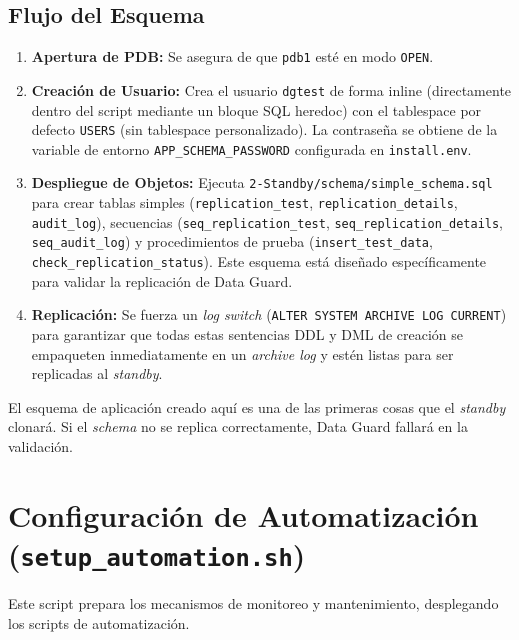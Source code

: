 \documentclass[11pt, a4paper]{report}
\begin{document}
\subsection{Flujo del Esquema}
\begin{enumerate}
    \item \textbf{Apertura de PDB:} Se asegura de que \texttt{pdb1} esté en modo \texttt{OPEN}.
\item \textbf{Creación de Usuario:} Crea el usuario \texttt{dgtest} de forma inline (directamente dentro del script mediante un bloque SQL heredoc) con el tablespace por defecto \texttt{USERS} (sin tablespace personalizado). La contraseña se obtiene de la variable de entorno \texttt{APP\_SCHEMA\_PASSWORD} configurada en \texttt{install.env}.
\item \textbf{Despliegue de Objetos:} Ejecuta \texttt{2-Standby/schema/simple\_schema.sql} para crear tablas simples (\texttt{replication\_test}, \texttt{replication\_details}, \texttt{audit\_log}), secuencias (\texttt{seq\_replication\_test}, \texttt{seq\_replication\_details}, \texttt{seq\_audit\_log}) y procedimientos de prueba (\texttt{insert\_test\_data}, \texttt{check\_replication\_status}). Este esquema está diseñado específicamente para validar la replicación de Data Guard.
\item \textbf{Replicación:} Se fuerza un \textit{log switch} (\texttt{ALTER SYSTEM ARCHIVE LOG CURRENT}) para garantizar que todas estas sentencias DDL y DML de creación se empaqueten inmediatamente en un \textit{archive log} y estén listas para ser replicadas al \textit{standby}.
\end{enumerate}
El esquema de aplicación creado aquí es una de las primeras cosas que el \textit{standby} clonará. Si el \textit{schema} no se replica correctamente, Data Guard fallará en la validación.

\section{Configuración de Automatización (\texttt{setup\_automation.sh})}

Este script prepara los mecanismos de monitoreo y mantenimiento, desplegando los scripts de automatización.
\end{document}
